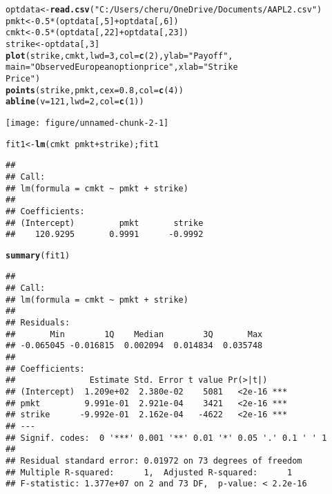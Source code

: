 \documentclass[12pt, a4paper]{report}\usepackage[]{graphicx}\usepackage[]{color}
\makeatletter
\def\maxwidth{ %
  \ifdim\Gin@nat@width>\linewidth
    \linewidth
  \else
    \Gin@nat@width
  \fi
}
\newcommand{\hlnum}[1]{\textcolor[rgb]{0.686,0.059,0.569}{#1}}%
\newcommand{\hlstr}[1]{\textcolor[rgb]{0.192,0.494,0.8}{#1}}%
\newcommand{\hlopt}[1]{\textcolor[rgb]{0,0,0}{#1}}%
\newcommand{\hlstd}[1]{\textcolor[rgb]{0.345,0.345,0.345}{#1}}%
\newcommand{\hlkwb}[1]{\textcolor[rgb]{0.69,0.353,0.396}{#1}}%
\newcommand{\hlkwc}[1]{\textcolor[rgb]{0.333,0.667,0.333}{#1}}%
\newcommand{\hlkwd}[1]{\textcolor[rgb]{0.737,0.353,0.396}{\textbf{#1}}}%
\newenvironment{kframe}{%
 \def\at@end@of@kframe{}%
 \ifinner\ifhmode%
  \def\at@end@of@kframe{\end{minipage}}%
  \begin{minipage}{\columnwidth}%
 \fi\fi%
 \def\FrameCommand##1{\hskip\@totalleftmargin \hskip-\fboxsep
 \colorbox{shadecolor}{##1}\hskip-\fboxsep
     \hskip-\linewidth \hskip-\@totalleftmargin \hskip\columnwidth}%
 \MakeFramed {\advance\hsize-\width
   \@totalleftmargin\z@ \linewidth\hsize
   \@setminipage}}%
 {\par\unskip\endMakeFramed%
 \at@end@of@kframe}
\newenvironment{knitrout}{}{} %
\makeatother
\begin{document}
\begin{knitrout}
\color{fgcolor}\begin{kframe}
\begin{alltt}
\hlstd{optdata}\hlkwb{<-}\hlkwd{read.csv}\hlstd{(}\hlstr{"C:/Users/cheru/OneDrive/Documents/AAPL2.csv"}\hlstd{)}
\hlstd{pmkt}\hlkwb{<-}\hlnum{0.5}\hlopt{*}\hlstd{(optdata[,}\hlnum{5}\hlstd{]}\hlopt{+}\hlstd{optdata[,}\hlnum{6}\hlstd{])}
\hlstd{cmkt}\hlkwb{<-}\hlnum{0.5}\hlopt{*}\hlstd{(optdata[,}\hlnum{22}\hlstd{]}\hlopt{+}\hlstd{optdata[,}\hlnum{23}\hlstd{])}
\hlstd{strike}\hlkwb{<-}\hlstd{optdata[,}\hlnum{3}\hlstd{]}
\hlkwd{plot}\hlstd{(strike,cmkt,}\hlkwc{lwd}\hlstd{=}\hlnum{3}\hlstd{,}\hlkwc{col}\hlstd{=}\hlkwd{c}\hlstd{(}\hlnum{2}\hlstd{),}\hlkwc{ylab}\hlstd{=}\hlstr{"Payoff"}\hlstd{,}
     \hlkwc{main}\hlstd{=}\hlstr{"Observed European option price "}\hlstd{,} \hlkwc{xlab}\hlstd{=}\hlstr{"Strike
Price"}\hlstd{)}
\hlkwd{points}\hlstd{(strike,pmkt,}\hlkwc{cex}\hlstd{=}\hlnum{0.8}\hlstd{,}\hlkwc{col}\hlstd{=}\hlkwd{c}\hlstd{(}\hlnum{4}\hlstd{))}
\hlkwd{abline}\hlstd{(}\hlkwc{v}\hlstd{=}\hlnum{121}\hlstd{,}\hlkwc{lwd}\hlstd{=}\hlnum{2}\hlstd{,}\hlkwc{col}\hlstd{=}\hlkwd{c}\hlstd{(}\hlnum{1}\hlstd{))}
\end{alltt}
\end{kframe}
\texttt{[image: figure/unnamed-chunk-2-1]} 
\begin{kframe}\begin{alltt}
\hlstd{fit1}\hlkwb{<-}\hlkwd{lm}\hlstd{(cmkt}\hlopt{~}\hlstd{pmkt}\hlopt{+}\hlstd{strike);fit1}
\end{alltt}
\begin{verbatim}
## 
## Call:
## lm(formula = cmkt ~ pmkt + strike)
## 
## Coefficients:
## (Intercept)         pmkt       strike  
##    120.9295       0.9991      -0.9992
\end{verbatim}
\begin{alltt}
\hlkwd{summary}\hlstd{(fit1)}
\end{alltt}
\begin{verbatim}
## 
## Call:
## lm(formula = cmkt ~ pmkt + strike)
## 
## Residuals:
##       Min        1Q    Median        3Q       Max 
## -0.065045 -0.016815  0.002094  0.014834  0.035748 
## 
## Coefficients:
##               Estimate Std. Error t value Pr(>|t|)    
## (Intercept)  1.209e+02  2.380e-02    5081   <2e-16 ***
## pmkt         9.991e-01  2.921e-04    3421   <2e-16 ***
## strike      -9.992e-01  2.162e-04   -4622   <2e-16 ***
## ---
## Signif. codes:  0 '***' 0.001 '**' 0.01 '*' 0.05 '.' 0.1 ' ' 1
## 
## Residual standard error: 0.01972 on 73 degrees of freedom
## Multiple R-squared:      1,	Adjusted R-squared:      1 
## F-statistic: 1.377e+07 on 2 and 73 DF,  p-value: < 2.2e-16
\end{verbatim}
\end{kframe}
\end{knitrout}
\end{document}
